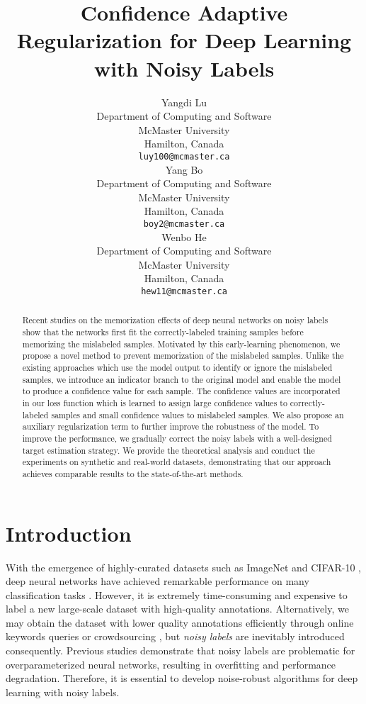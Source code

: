 \documentclass{article}
\title{Confidence Adaptive Regularization for Deep Learning with Noisy Labels}
\author{Yangdi Lu \\
  Department of Computing and Software\\
  McMaster University\\
  Hamilton, Canada \\
  \texttt{luy100@mcmaster.ca} \\
\And
  Yang Bo \\
 Department of Computing and Software\\
 McMaster University\\
 Hamilton, Canada \\
 \texttt{boy2@mcmaster.ca} \\
 \And
 Wenbo He \\
 Department of Computing and Software\\
 McMaster University\\
 Hamilton, Canada \\
 \texttt{hew11@mcmaster.ca} \\
}
\begin{document}
\maketitle

\begin{abstract}


	
	Recent studies on the memorization effects of deep neural networks on noisy labels show that the networks first fit the correctly-labeled training samples before memorizing the mislabeled samples. Motivated by this early-learning phenomenon, we propose a novel method to prevent memorization of the mislabeled samples. Unlike the existing approaches which use the model output to identify or ignore the mislabeled samples, we introduce an indicator branch to the original model and enable the model to produce a confidence value for each sample. The confidence values are incorporated in our loss function which is learned to assign large confidence values to correctly-labeled samples and small confidence values to mislabeled samples. We also propose an auxiliary regularization term to further improve the robustness of the model. To improve the performance, we gradually correct the noisy labels with a well-designed target estimation strategy. We provide the theoretical analysis and conduct the experiments on synthetic and real-world datasets, demonstrating that our approach achieves comparable results to the state-of-the-art methods.
	




	


\end{abstract}

\section{Introduction}
With the emergence of highly-curated datasets such as ImageNet \cite{deng2009imagenet} and CIFAR-10 \cite{krizhevsky2009learning}, deep neural networks have achieved remarkable performance on many classification tasks \cite{krizhevsky2012imat,noh2015learning,he2016deep}. However, it is extremely time-consuming and expensive to label a new large-scale dataset with high-quality annotations. Alternatively, we may obtain the dataset with lower quality annotations efficiently through online keywords queries \cite{li2017webvision} or crowdsourcing \cite{yu2018learning}, but \emph{noisy labels} are inevitably introduced consequently. Previous studies \cite{arpit2017closer,zhang2018understanding} demonstrate that noisy labels are problematic for overparameterized neural networks, resulting in overfitting and performance degradation. Therefore, it is essential to develop noise-robust algorithms for deep learning with noisy labels.
\end{document}
